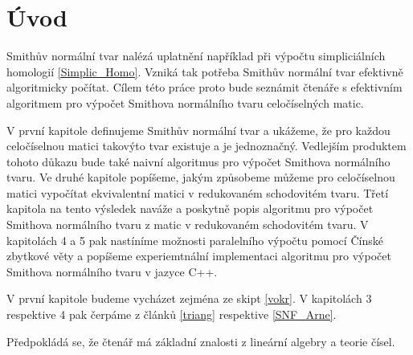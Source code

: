 \chapter*{Úvod}

Smithův normální tvar nalézá uplatnění například při výpočtu simpliciálních
homologií \ref{Simplic_Homo}. Vzniká tak potřeba Smithův normální tvar efektivně
algoritmicky počítat. Cílem této práce proto bude seznámit čtenáře s efektivním
algoritmem pro výpočet Smithova normálního tvaru celočíselných matic.

V první kapitole definujeme Smithův normální tvar a ukážeme, že pro každou
celočíselnou matici takovýto tvar existuje a je jednoznačný. Vedlejším produktem
tohoto důkazu bude také naivní algoritmus pro výpočet Smithova normálního tvaru.
Ve druhé kapitole popíšeme, jakým způsobeme můžeme pro celočíselnou matici
vypočítat ekvivalentní matici v redukovaném schodovitém tvaru. Třetí kapitola
na tento výsledek naváže a poskytně popis algoritmu pro výpočet Smithova
normálního tvaru z matic v redukovaném schodovitém tvaru. V kapitolách 4 a 5
pak nastíníme možnosti paralelního výpočtu pomocí Čínské zbytkové věty a popíšeme
experiemtnální implementaci algoritmu pro výpočet Smithova normálního tvaru v
jazyce C++.

V první kapitole budeme vycházet zejména ze skipt \ref{vokr}. V kapitolách
3 respektive 4 pak čerpáme z článků \ref{triang} respektive \ref{SNF_Arne}.

Předpokládá se, že čtenář má základní znalosti z lineární algebry a teorie čísel.




\cleardoublepage

